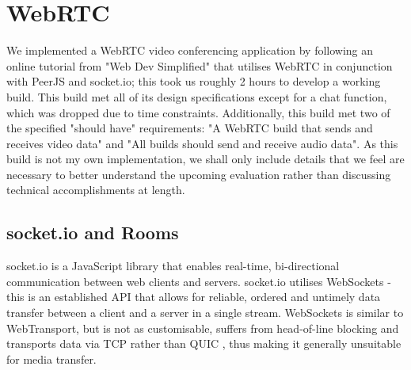 




\section{WebRTC}
We implemented a WebRTC video conferencing application by following an online tutorial from "Web Dev Simplified" \cite{web_dev_simplified} that utilises WebRTC in conjunction with PeerJS and socket.io; this took us roughly 2 hours to develop a working build. This build met all of its design specifications except for a chat function, which was dropped due to time constraints. Additionally, this build met two of the specified "should have" requirements: "A WebRTC build that sends and receives video data" and "All builds should send and receive audio data". As this build is not my own implementation, we shall only include details that we feel are necessary to better understand the upcoming evaluation rather than discussing technical accomplishments at length.

\subsection{socket.io and Rooms}
socket.io is a JavaScript library that enables real-time, bi-directional communication between web clients and servers. socket.io utilises WebSockets - this is an established API that allows for reliable, ordered and untimely data transfer between a client and a server in a single stream. WebSockets is similar to WebTransport, but is not as customisable, suffers from head-of-line blocking and transports data via TCP rather than QUIC \cite{websockets_mozilla_docs}, thus making it generally unsuitable for media transfer.

